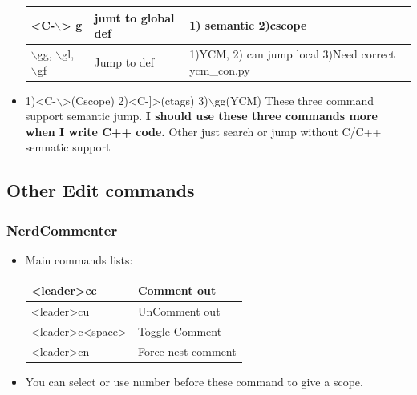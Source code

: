 \documentclass[a4paper,11pt,twoside]{book}
\begin{document}
\begin{itemize}
\begin{center}
\begin{tabular}{p{}|p{}|p{}}
		\hline
	   <C-$\backslash$> g & jumt to global def & 1) semantic 2)cscope \\


		\hline 
		$\backslash$gg, $\backslash$gl, $\backslash$gf & Jump to def & 1)YCM, 2) can jump local 3)Need correct ycm\_con.py  \\
		
				\end{tabular}
	\end{center}

	\item 1)<C-$\backslash$>(Cscope) 2)<C-]>(ctags) 3)$\backslash$gg(YCM) These three command support semantic jump. \textbf{I should use these three commands more when I write C++ code.}  Other just search or jump without C/C++ semnatic support

	\end{itemize}
	
\subsection{Other Edit commands}

\subsubsection{NerdCommenter}
\begin{itemize}
		\item Main commands lists:  

\begin{tabular}{p{}|p{}}
		\hline 
		[count]<leader>cc & Comment out \\
		\hline 
		[count]<leader>cu & UnComment out \\
		\hline 
		[count]<leader>c<space> & Toggle Comment \\
		\hline
		[count]<leader>cn & Force nest comment \\
\end{tabular}
\item You can select or use number before these command to give a scope. 
\end{itemize}
\end{document}

